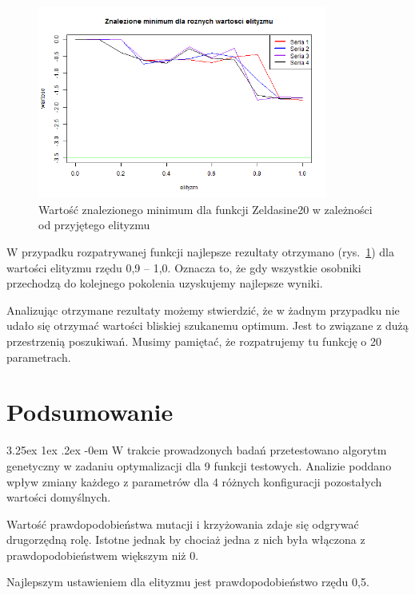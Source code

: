\documentclass[11pt, a4paper]{article}
\makeatletter
\newcommand{\fbi}{\leavevmode{\parindent=1em\indent}}
\renewcommand\paragraph{\@startsection{paragraph}{5}{\z@}
  {3.25ex \@plus1ex \@minus.2ex}
  {-0em}
  {\normalfont\normalsize\bfseries}}
\makeatother
\begin{document}
\begin{figure}[H]
	\begin{center}
		\includegraphics[width=0.85\textwidth]{./assets/Zeldasine206.png}
		\caption{Wartość znalezionego minimum dla funkcji Zeldasine20 w zależności od przyjętego elityzmu}
		\label{fig:zeldasine6}
	\end{center}
\end{figure}

\fbi
W przypadku rozpatrywanej funkcji najlepsze rezultaty otrzymano (rys.~\ref{fig:zeldasine6}) dla wartości elityzmu rzędu 0,9 -- 1,0. Oznacza to, że gdy wszystkie osobniki przechodzą do kolejnego pokolenia uzyskujemy najlepsze wyniki.

\fbi
Analizując otrzymane rezultaty możemy stwierdzić, że w żadnym przypadku nie udało się otrzymać wartości bliskiej szukanemu optimum. Jest to związane z dużą przestrzenią poszukiwań. Musimy pamiętać, że rozpatrujemy tu funkcję o 20 parametrach.

\newpage
\section{Podsumowanie}
\paragraph{}
W trakcie prowadzonych badań przetestowano algorytm genetyczny w zadaniu optymalizacji dla 9 funkcji testowych. Analizie poddano wpływ zmiany każdego z parametrów dla 4 różnych konfiguracji pozostałych wartości domyślnych.

\fbi
Wartość prawdopodobieństwa mutacji i krzyżowania zdaje się odgrywać drugorzędną rolę. Istotne jednak by chociaż jedna z nich była włączona z prawdopodobieństwem większym niż 0.

\fbi
Najlepszym ustawieniem dla elityzmu jest prawdopodobieństwo rzędu 0,5.
\end{document}
